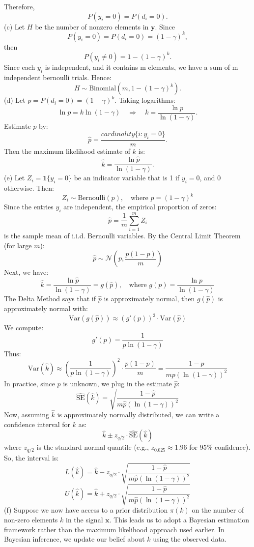 \documentclass{article}
\begin{document}
Therefore,
\[
P(y_i = 0) = P(d_i = 0).
\]
(c) Let \(H\) be the number of nonzero elements in \(\boldsymbol{y}\). Since
\[
P(y_i = 0) = P(d_i = 0) = (1 - \gamma)^k,
\]
then
\[
P(y_i \neq 0) = 1 - (1 - \gamma)^k.
\]
Since each \(y_i\) is independent, and it contains m elements, we have a sum of m independent bernoulli trials. Hence:
\[
H \sim \text{Binomial}\left(m, 1 - (1 - \gamma)^k\right).
\]
(d) Let \(p = P(d_i = 0) = (1 - \gamma)^k\). Taking logarithms:
\[
\ln p = k \ln (1 - \gamma) \quad \Rightarrow \quad k = \frac{\ln p}{\ln (1 - \gamma)}.
\]
Estimate \(p\) by:
\[
\hat{p} = \frac{cardinality\{i: y_i = 0\}}{m}.
\]
Then the maximum likelihood estimate of \(k\) is:
\[
\hat{k} = \frac{\ln \hat{p}}{\ln (1 - \gamma)}.
\]
(e) Let \(Z_i = \mathbf{1}\{y_i = 0\}\) be an indicator variable that is 1 if \(y_i = 0\), and 0 otherwise. Then:
\[
Z_i \sim \text{Bernoulli}(p), \quad \text{where } p = (1 - \gamma)^k
\]
Since the entries \(y_i\) are independent, the empirical proportion of zeros:
\[
\hat{p} = \frac{1}{m} \sum_{i=1}^m Z_i
\]
is the sample mean of i.i.d. Bernoulli variables. By the Central Limit Theorem (for large \(m\)):
\[
\hat{p} \sim \mathcal{N}\left(p, \frac{p(1 - p)}{m}\right)
\]
Next, we have:
\[
\hat{k} = \frac{\ln \hat{p}}{\ln(1 - \gamma)} = g(\hat{p}), \quad \text{where } g(p) = \frac{\ln p}{\ln(1 - \gamma)}
\]
The Delta Method says that if \(\hat{p}\) is approximately normal, then \(g(\hat{p})\) is approximately normal with:
\[
\text{Var}(g(\hat{p})) \approx \left(g'(p)\right)^2 \cdot \text{Var}(\hat{p})
\]
We compute:
\[
g'(p) = \frac{1}{p \ln(1 - \gamma)}
\]
Thus:
\[
\text{Var}(\hat{k}) \approx \left( \frac{1}{p \ln(1 - \gamma)} \right)^2 \cdot \frac{p(1 - p)}{m} = \frac{1 - p}{m p (\ln(1 - \gamma))^2}
\]
In practice, since \(p\) is unknown, we plug in the estimate \(\hat{p}\):
\[
\widehat{\text{SE}}(\hat{k}) = \sqrt{ \frac{1 - \hat{p}}{m \hat{p} (\ln(1 - \gamma))^2} }
\]
Now, assuming \(\hat{k}\) is approximately normally distributed, we can write a confidence interval for \(k\) as:
\[
\hat{k} \pm z_{q/2} \cdot \widehat{\text{SE}}(\hat{k})
\]
where \(z_{q/2}\) is the standard normal quantile (e.g., \(z_{0.025} \approx 1.96\) for 95\% confidence). So, the interval is:
\[
L(\hat{k}) = \hat{k} - z_{q/2} \cdot \sqrt{ \frac{1 - \hat{p}}{m \hat{p} (\ln(1 - \gamma))^2} }
\]
\[
U(\hat{k}) = \hat{k} + z_{q/2} \cdot \sqrt{ \frac{1 - \hat{p}}{m \hat{p} (\ln(1 - \gamma))^2} }
\]
(f)
Suppose we now have access to a prior distribution \(\pi(k)\) on the number of non-zero elements \(k\) in the signal \(\boldsymbol{x}\). This leads us to adopt a Bayesian estimation framework rather than the maximum likelihood approach used earlier. In Bayesian inference, we update our belief about \(k\) using the observed data. \newpage
\end{document}
